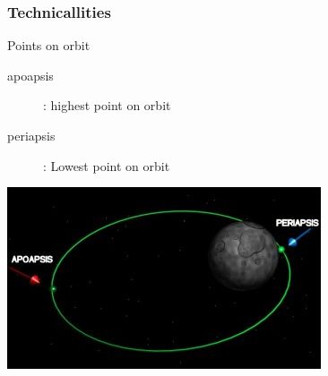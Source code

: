 \begin{frame}
    \frametitle{Technicallities}
    \begin{block}{Points on orbit}
        \begin{description}
            \item[apoapsis]: highest point on orbit
            \item[periapsis]: Lowest point on orbit
        \end{description}
    \end{block}
    \begin{block}{}
        \begin{center}
            \includegraphics[scale=0.6]{images/apoapsis_periapsis.jpg}
        \end{center}
    \end{block}
\end{frame}

